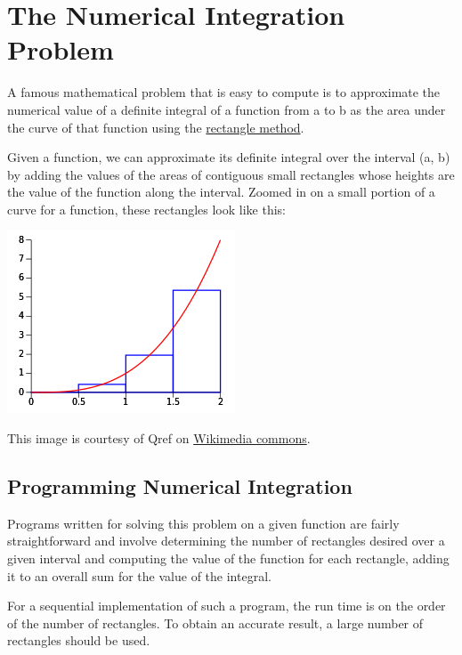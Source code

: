 \documentclass[letterpaper,10pt,openany,oneside]{sphinxmanual}
\begin{document}
\chapter{The Numerical Integration Problem}
\label{NumericalIntegration::doc}\label{NumericalIntegration:visualize-data-decomposition-of-numerical-integration}\label{NumericalIntegration:the-numerical-integration-problem}
A famous mathematical problem that is easy to compute is to approximate the numerical value of a definite integral of a function from a to b as the area under the curve of that function using the \href{http://en.wikipedia.org/wiki/Rectangle\_method}{rectangle method}.

Given a function, we can approximate its definite integral over the interval (a, b) by adding the values of the areas of contiguous small rectangles whose heights are the value of the function along the interval. Zoomed in on a small portion of a curve for a function, these rectangles look like this:

\includegraphics{MidRiemann2.png}

This image is courtesy of Qref on \href{http://commons.wikimedia.org/wiki/File:MidRiemann2.svg}{Wikimedia commons}.


\section{Programming Numerical Integration}
\label{NumericalIntegration:programming-numerical-integration}
Programs written for solving this problem on a given function are fairly straightforward and involve determining the number of rectangles desired over a given interval and computing the value of the function for each rectangle, adding it to an overall sum for the value of the integral.

For a sequential implementation of such a program, the run time is on the order of the number of rectangles. To obtain an accurate result, a large number of rectangles should be used.
\end{document}
